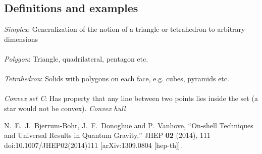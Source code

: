 \documentclass[a4paper,12pt]{article}
\begin{document}
\subsection{Definitions and examples}
\textit{Simplex}: Generalization of the notion of a triangle or tetrahedron to arbitrary dimensions
\\\\
\textit{Polygon}: Triangle, quadrilateral, pentagon etc.
\\\\
\textit{Tetrahedron}: Solids with polygons on each face, e.g. cubes, pyramids etc. 
\\\\
\textit{Convex set C}: Has property that any line between two points lies inside the set (a star would not be convex). 
\textit{Convex hull}
\newpage
\begin{thebibliography}{99}

N.~E.~J.~Bjerrum-Bohr, J.~F.~Donoghue and P.~Vanhove,
``On-shell Techniques and Universal Results in Quantum Gravity,''
JHEP \textbf{02} (2014), 111
doi:10.1007/JHEP02(2014)111
[arXiv:1309.0804 [hep-th]].

\end{thebibliography}
\end{document}
